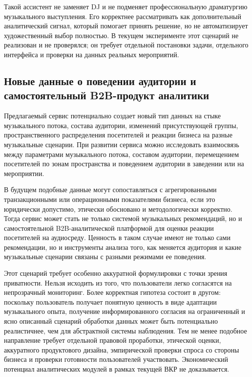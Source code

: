 Такой ассистент не заменяет DJ и не подменяет профессиональную драматургию музыкального выступления. Его корректнее рассматривать как дополнительный аналитический сигнал, который помогает принять решение, но не автоматизирует художественный выбор полностью. В текущем эксперименте этот сценарий не реализован и не проверялся; он требует отдельной постановки задачи, отдельного интерфейса и проверки на данных реальных мероприятий.

\subsection{Новые данные о поведении аудитории и самостоятельный B2B-продукт аналитики}
\label{subsec:ch6:b2b-analytics}

Предлагаемый сервис потенциально создает новый тип данных на стыке музыкального потока, состава аудитории, изменений присутствующей группы, пространственного распределения посетителей и реакции бизнеса на разные музыкальные сценарии. При развитии сервиса можно исследовать взаимосвязь между параметрами музыкального потока, составом аудитории, перемещением посетителей по зонам пространства и поведением аудитории в заведении или на мероприятии.

В будущем подобные данные могут сопоставляться с агрегированными транзакционными или операционными показателями бизнеса, если это юридически допустимо, этически обосновано и методологически корректно. Тогда сервис может стать не только системой музыкальных рекомендаций, но и самостоятельной B2B-аналитической платформой для оценки реакции посетителей на аудиосреду. Ценность в таком случае имеют не только сами рекомендации, но и инструменты анализа того, как меняется аудитория и какие музыкальные сценарии связаны с разными режимами ее поведения.

Этот сценарий требует особенно аккуратной формулировки с точки зрения приватности. Нельзя исходить из того, что пользователи легко согласятся на непрозрачный мониторинг. Более корректная гипотеза состоит в другом: поскольку пользователь получает понятную ценность в виде адаптации музыкального опыта, получение информированного согласия на ограниченный и ясно описанный сценарий обработки данных может быть потенциально реалистичнее, чем для абстрактной системы наблюдения. Тем не менее подобное направление требует отдельной правовой проработки, этической оценки, аккуратного продуктового дизайна, эмпирической проверки спроса со стороны бизнеса и проверки готовности пользователей участвовать. Экономический потенциал аналитических модулей в рамках текущей ВКР не доказывается.

